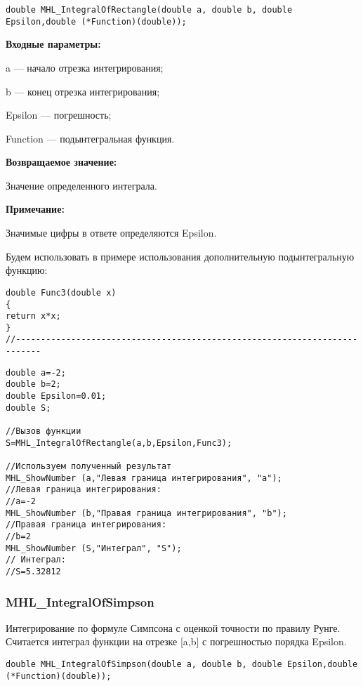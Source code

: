 \documentclass[a4paper,12pt]{article}
\begin{document}
\begin{lstlisting}[label=code_syntax_MHL_IntegralOfRectangle,caption=Синтаксис]
double MHL_IntegralOfRectangle(double a, double b, double Epsilon,double (*Function)(double));
\end{lstlisting}

\textbf{Входные параметры:}

 a --- начало отрезка интегрирования;
 
 b --- конец отрезка интегрирования;
 
 Epsilon --- погрешность;
 
 Function --- подынтегральная функция.

\textbf{Возвращаемое значение:}
 
 Значение определенного интеграла.
 
 \textbf{Примечание:}
 
 Значимые цифры в ответе определяются Epsilon.

Будем использовать в примере использования дополнительную подынтегральную функцию:

\begin{lstlisting}[caption=Дополнительная функция]
double Func3(double x)
{
return x*x;
}
//---------------------------------------------------------------------------
\end{lstlisting}


\begin{lstlisting}[label=code_use_MHL_IntegralOfRectangle,caption=Пример использования]
double a=-2;
double b=2;
double Epsilon=0.01;
double S;

//Вызов функции
S=MHL_IntegralOfRectangle(a,b,Epsilon,Func3);

//Используем полученный результат
MHL_ShowNumber (a,"Левая граница интегрирования", "a");
//Левая граница интегрирования:
//a=-2
MHL_ShowNumber (b,"Правая граница интегрирования", "b");
//Правая граница интегрирования:
//b=2
MHL_ShowNumber (S,"Интеграл", "S");
// Интеграл:
//S=5.32812
\end{lstlisting}

\subsubsection{MHL\_IntegralOfSimpson}\label{MHL_IntegralOfSimpson}

Интегрирование по формуле Симпсона с оценкой точности по правилу Рунге. Считается интеграл функции на отрезке [a,b] с погрешностью порядка Epsilon.


\begin{lstlisting}[label=code_syntax_MHL_IntegralOfSimpson,caption=Синтаксис]
double MHL_IntegralOfSimpson(double a, double b, double Epsilon,double (*Function)(double));
\end{lstlisting}
\end{document}
